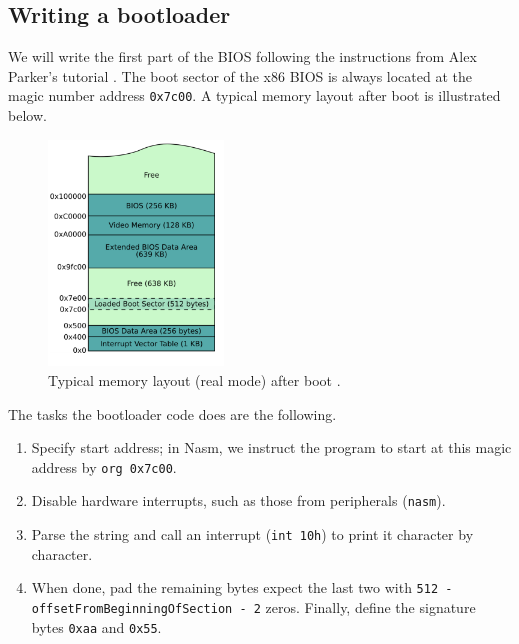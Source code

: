 \documentclass[a4paper]{article}
\begin{document}
\subsection{Writing a bootloader}
We will write the first part of the BIOS following the instructions from Alex Parker's tutorial \cite{parkertut}.  
The boot sector of the x86 BIOS is always located at the magic number address \texttt{0x7c00}.  A typical memory layout after boot is illustrated below.
\begin{figure}[H]
    \centering
    \includegraphics[height=6cm]{img/real_mom_mem_layout.PNG}
    \caption{Typical memory layout (real mode) after boot \cite{lecnotesblunde}.}
\end{figure}
The tasks the bootloader code does are the following.
\begin{enumerate}
    \item Specify start address; in Nasm, we instruct the program to start at this magic address by \texttt{org 0x7c00}.
    \item Disable hardware interrupts, such as those from peripherals (\texttt{nasm}).
    \item Parse the string and call an interrupt (\texttt{int 10h}) to print it character by character.
    \item When done, pad the remaining bytes expect the last two with \texttt{512 - offsetFromBeginningOfSection - 2} zeros. Finally, define the signature bytes  \texttt{0xaa} and \texttt{0x55}.
\end{enumerate}


\end{document}
